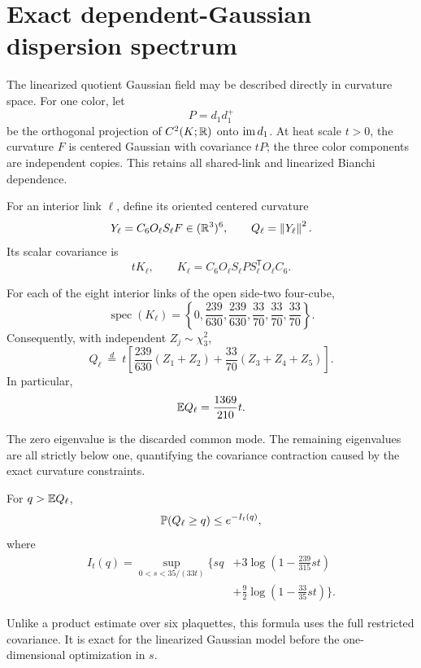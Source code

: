 \section{Exact dependent-Gaussian dispersion spectrum}
\label{sec:gaussian}

The linearized quotient Gaussian field may be described directly in curvature
space.  For one color, let
\[
 P=d_1d_1^+
\]
be the orthogonal projection of $C^2(K;\mathbb{R})$ onto $\operatorname{im} d_1$.  At heat scale
$t>0$, the curvature $F$ is centered Gaussian with covariance $tP$; the three
color components are independent copies.  This retains all shared-link and
linearized Bianchi dependence.

For an interior link $\ell$, define its oriented centered curvature
\[
  Y_\ell=C_6O_\ell S_\ell F\in(\mathbb{R}^3)^6,
  \qquad Q_\ell=\left\lVert Y_\ell\right\rVert^2.
\]
Its scalar covariance is
\[
  tK_\ell,
  \qquad
  K_\ell=C_6O_\ell S_\ell P S_\ell^\mathsf TO_\ell C_6.
\]

\begin{theorem}
\label{thm:gaussian-spectrum}
For each of the eight interior links of the open side-two four-cube,
\[
 \operatorname{spec}(K_\ell)=
 \left\{0,
 \frac{239}{630},\frac{239}{630},
 \frac{33}{70},\frac{33}{70},\frac{33}{70}\right\}.
\]
Consequently, with independent $Z_j\sim\chi^2_3$,
\[
 Q_\ell\ \overset{d}=\ t\left[
 \frac{239}{630}(Z_1+Z_2)
 +\frac{33}{70}(Z_3+Z_4+Z_5)
 \right].
\]
In particular,
\[
 \mathbb{E} Q_\ell=\frac{1369}{210}t.
\]
\end{theorem}

The zero eigenvalue is the discarded common mode.  The remaining eigenvalues
are all strictly below one, quantifying the covariance contraction caused by
the exact curvature constraints.

\begin{corollary}
For $q>\mathbb{E} Q_\ell$,
\[
 \mathbb{P}(Q_\ell\ge q)\le e^{-I_t(q)},
\]
where
\begin{align}
 I_t(q)=\sup_{0<s<35/(33t)}\Bigg\{sq
 &+3\log\left(1-\frac{239}{315}st\right)\\
 &+\frac92\log\left(1-\frac{33}{35}st\right)\Bigg\}.
\end{align}
\end{corollary}

Unlike a product estimate over six plaquettes, this formula uses the full
restricted covariance.  It is exact for the linearized Gaussian model before
the one-dimensional optimization in $s$.
